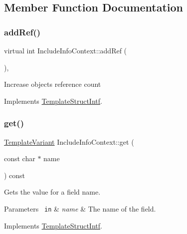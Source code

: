 \subsection{Member Function Documentation}
\mbox{\label{class_include_info_context_a0de1d814488fa964c23ec201832f7ca7}} 
\subsubsection{\texorpdfstring{addRef()}{addRef()}}
{\footnotesize\ttfamily virtual int Include\+Info\+Context\+::add\+Ref (\begin{DoxyParamCaption}{ }\end{DoxyParamCaption})\hspace{0.3cm}{\ttfamily [inline]}, {\ttfamily [virtual]}}

Increase object\textquotesingle{}s reference count 

Implements \mbox{\hyperlink{class_template_struct_intf_a05fe97ad47633beb326f69686faed581}{Template\+Struct\+Intf}}.

\mbox{\label{class_include_info_context_a16525103c9f37d8749b49211ae51e6e1}} 
\subsubsection{\texorpdfstring{get()}{get()}}
{\footnotesize\ttfamily \mbox{\hyperlink{class_template_variant}{Template\+Variant}} Include\+Info\+Context\+::get (\begin{DoxyParamCaption}\item[{const char $\ast$}]{name }\end{DoxyParamCaption}) const\hspace{0.3cm}{\ttfamily [virtual]}}

Gets the value for a field name. 
\begin{DoxyParams}[1]{Parameters}
\mbox{\texttt{ in}}  & {\em name} & The name of the field. \\
\hline
\end{DoxyParams}


Implements \mbox{\hyperlink{class_template_struct_intf_a3d610cb81b4adbb531ebed3aa3d09b51}{Template\+Struct\+Intf}}.

